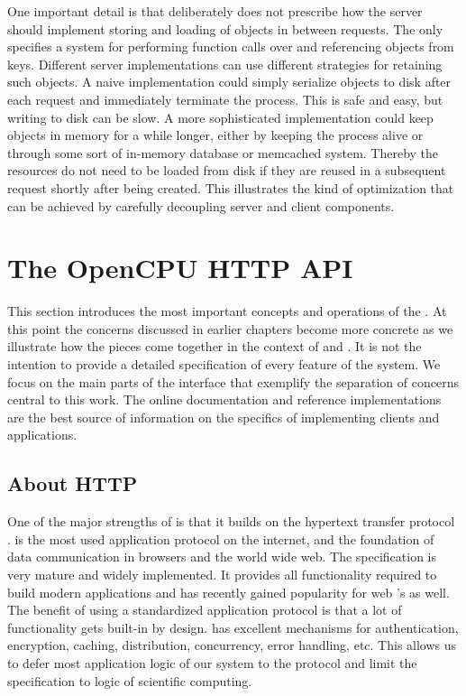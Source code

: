 One important detail is that \OpenCPU deliberately does not prescribe how the server should implement storing and loading of objects in between requests. The \API only specifies a system for performing \R function calls over \HTTP and referencing objects from keys. Different server implementations can use different strategies for retaining such objects. A naive implementation could simply serialize objects to disk after each request and immediately terminate the process. This is safe and easy, but writing to disk can be slow. A more sophisticated implementation could keep objects in memory for a while longer, either by keeping the \R process alive or through some sort of in-memory database or memcached system. 
Thereby the resources do not need to be loaded from disk if they are reused in a subsequent request shortly after being created. This illustrates the kind of optimization that can be achieved by carefully decoupling server and client components.

 
\section{The OpenCPU HTTP API}

This section introduces the most important concepts and operations of the \API. At this point the concerns discussed in earlier chapters become more concrete as we illustrate how the pieces come together in the context of \R and \HTTP. It is not the intention to provide a detailed specification of every feature of the system. We focus on the main parts of the interface that exemplify the separation of concerns central to this work. The online documentation and reference implementations are the best source of information on the specifics of implementing clients and applications.

\subsection{About HTTP}

One of the major strengths of \OpenCPU is that it builds on the hypertext transfer protocol \citep{rfc2616}. \HTTP is the most used application protocol on the internet, and the foundation of data communication in browsers and the world wide web. The \HTTP specification is very mature and widely implemented. It provides all functionality required to build modern applications and has recently gained popularity for web \API's as well. The benefit of using a standardized application protocol is that a lot of functionality gets built-in by design. \HTTP has excellent mechanisms for authentication, encryption, caching, distribution, concurrency, error handling, etc. This allows us to defer most application logic of our system to the protocol and limit the \API specification to logic of scientific computing. 

